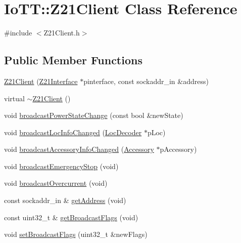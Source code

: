 \hypertarget{classIoTT_1_1Z21Client}{}\section{Io\+TT\+:\+:Z21\+Client Class Reference}
\label{classIoTT_1_1Z21Client}


{\ttfamily \#include $<$Z21\+Client.\+h$>$}

\subsection*{Public Member Functions}
\begin{DoxyCompactItemize}
\item 
\hyperlink{classIoTT_1_1Z21Client_ac1d627c4d3c9679a4cd00e0ea79ee3cb}{Z21\+Client} (\hyperlink{classIoTT_1_1Z21Interface}{Z21\+Interface} $\ast$pinterface, const sockaddr\+\_\+in \&address)
\item 
virtual \hyperlink{classIoTT_1_1Z21Client_a265ac239fe9334d8f856ee99f3a57be9}{$\sim$\+Z21\+Client} ()
\item 
void \hyperlink{classIoTT_1_1Z21Client_a0b1d7a92231c8fcd0fd4ad69c37dc14b}{broadcast\+Power\+State\+Change} (const bool \&new\+State)
\item 
void \hyperlink{classIoTT_1_1Z21Client_a6ef2ff77eee49c75b1c9b4ad88ab4b64}{broadcast\+Loc\+Info\+Changed} (\hyperlink{classIoTT_1_1LocDecoder}{Loc\+Decoder} $\ast$p\+Loc)
\item 
void \hyperlink{classIoTT_1_1Z21Client_a735b31947ef82db5bfea9acf07057a10}{broadcast\+Accessory\+Info\+Changed} (\hyperlink{classIoTT_1_1Accessory}{Accessory} $\ast$p\+Accessory)
\item 
void \hyperlink{classIoTT_1_1Z21Client_a2aee3301db3f99972e24894830420d66}{broadcast\+Emergency\+Stop} (void)
\item 
void \hyperlink{classIoTT_1_1Z21Client_ad4b0a3d84101b8b33502555c67f55fc0}{broadcast\+Overcurrent} (void)
\item 
const sockaddr\+\_\+in \& \hyperlink{classIoTT_1_1Z21Client_a886c148c5ceb7041cb9f63eef27d9ee0}{get\+Address} (void)
\item 
const uint32\+\_\+t \& \hyperlink{classIoTT_1_1Z21Client_a2af133c8defb28fd340f2c866233bfbb}{get\+Broadcast\+Flags} (void)
\item 
void \hyperlink{classIoTT_1_1Z21Client_a71fe8443b6348fbb0f1af386967ebe5b}{set\+Broadcast\+Flags} (uint32\+\_\+t \&new\+Flags)
\end{DoxyCompactItemize}

